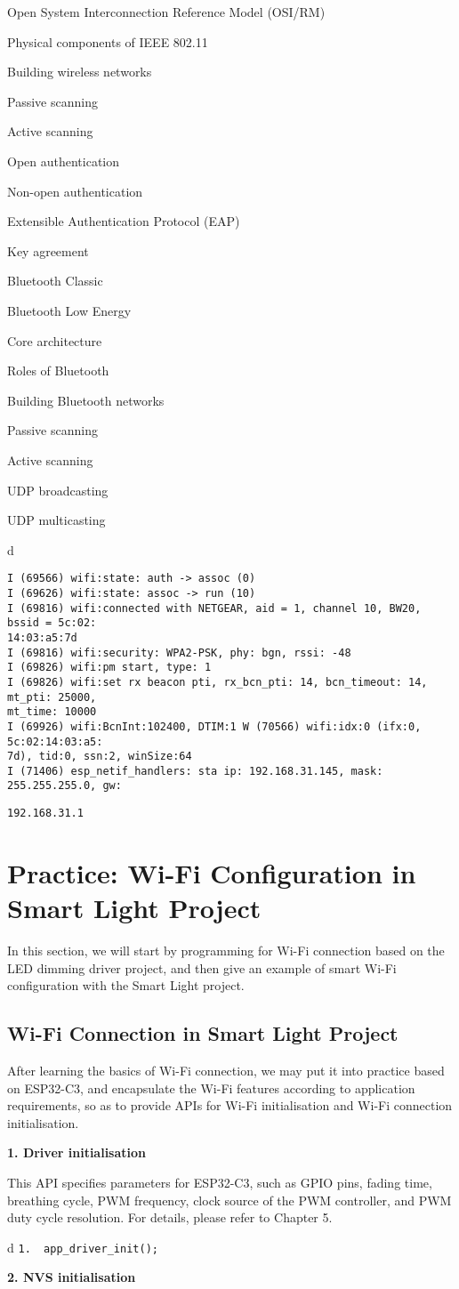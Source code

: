 \documentclass[a4paper,12pt]{book}
\begin{document}
\begin{term}{Open System Interconnection Reference Model (OSI/RM)}
\begin{term}{Physical components of IEEE 802.11}
\begin{term}{Building wireless networks}
\begin{term}{Passive scanning}
\begin{term}{Active scanning}
\begin{term}{Open authentication}
\begin{term}{Non-open authentication}
\begin{term}{Extensible Authentication Protocol (EAP)}
\begin{term}{Key agreement}
\begin{term}{Bluetooth Classic}
\begin{term}{Bluetooth Low Energy}
\begin{term}{Core architecture}
\begin{term}{Roles of Bluetooth}
\begin{term}{Building Bluetooth networks}
\begin{term}{Passive scanning}
\begin{term}{Active scanning}
\begin{term}{UDP broadcasting}
\begin{term}{UDP multicasting}
\fontsize{9.9pt}{9.9pt}\selectfont
\begin{tabular}{d}
\vspace{2pt}
\begin{verbatim}
I (69566) wifi:state: auth -> assoc (0)
I (69626) wifi:state: assoc -> run (10) 
I (69816) wifi:connected with NETGEAR, aid = 1, channel 10, BW20, bssid = 5c:02:
14:03:a5:7d
I (69816) wifi:security: WPA2-PSK, phy: bgn, rssi: -48
I (69826) wifi:pm start, type: 1
I (69826) wifi:set rx beacon pti, rx_bcn_pti: 14, bcn_timeout: 14, mt_pti: 25000,
mt_time: 10000
I (69926) wifi:BcnInt:102400, DTIM:1 W (70566) wifi:idx:0 (ifx:0, 5c:02:14:03:a5:
7d), tid:0, ssn:2, winSize:64
I (71406) esp_netif_handlers: sta ip: 192.168.31.145, mask: 255.255.255.0, gw:
\end{verbatim} 
\verb|192.168.31.1|
\end{tabular}


\section{Practice: Wi-Fi Configuration in Smart Light Project}
In this section, we will start by programming for Wi-Fi connection based on the LED dimming driver project, and then give an example of smart Wi-Fi configuration with the Smart Light project.

\subsection{Wi-Fi Connection in Smart Light Project}
After learning the basics of Wi-Fi connection, we may put it into practice based on ESP32-C3, and encapsulate the Wi-Fi features according to application requirements, so as to provide APIs for Wi-Fi initialisation and Wi-Fi connection initialisation.

\textbf{1. Driver initialisation}

This API specifies parameters for ESP32-C3, such as GPIO pins, fading time, breathing cycle, PWM frequency, clock source of the PWM controller, and PWM duty cycle resolution. For details, please refer to Chapter 5.


\begin{tabular}{d}
\verb|1.  app_driver_init();|
\end{tabular}


\textbf{2. NVS initialisation}


\end{term}
\end{term}
\end{term}
\end{term}
\end{term}
\end{term}
\end{term}
\end{term}
\end{term}
\end{term}
\end{term}
\end{term}
\end{term}
\end{term}
\end{term}
\end{term}
\end{term}
\end{term}
\end{document}
